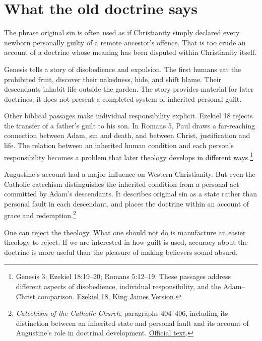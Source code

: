 \documentclass[12pt,a4paper]{book}
\begin{document}
\section*{What the old doctrine says}

The phrase original sin is often used as if Christianity simply declared every newborn personally guilty of a remote ancestor's offence. That is too crude an account of a doctrine whose meaning has been disputed within Christianity itself.

Genesis tells a story of disobedience and expulsion. The first humans eat the prohibited fruit, discover their nakedness, hide, and shift blame. Their descendants inhabit life outside the garden. The story provides material for later doctrines; it does not present a completed system of inherited personal guilt.

Other biblical passages make individual responsibility explicit. Ezekiel 18 rejects the transfer of a father's guilt to his son. In Romans 5, Paul draws a far-reaching connection between Adam, sin and death, and between Christ, justification and life. The relation between an inherited human condition and each person's responsibility becomes a problem that later theology develops in different ways.\footnote{Genesis 3; Ezekiel 18:19--20; Romans 5:12--19. These passages address different aspects of disobedience, individual responsibility, and the Adam--Christ comparison. \href{https://www.biblegateway.com/passage/?search=Ezekiel\%2018&version=KJV}{Ezekiel 18, King James Version}.}

Augustine's account had a major influence on Western Christianity. But even the Catholic catechism distinguishes the inherited condition from a personal act committed by Adam's descendants. It describes original sin as a state rather than personal fault in each descendant, and places the doctrine within an account of grace and redemption.\footnote{\emph{Catechism of the Catholic Church}, paragraphs 404--406, including its distinction between an inherited state and personal fault and its account of Augustine's role in doctrinal development. \href{https://www.vatican.va/content/catechism/en/part_one/section_two/chapter_one/article_1/paragraph_7_the_fall.html}{Official text}.}

One can reject the theology. What one should not do is manufacture an easier theology to reject. If we are interested in how guilt is used, accuracy about the doctrine is more useful than the pleasure of making believers sound absurd.
\end{document}
